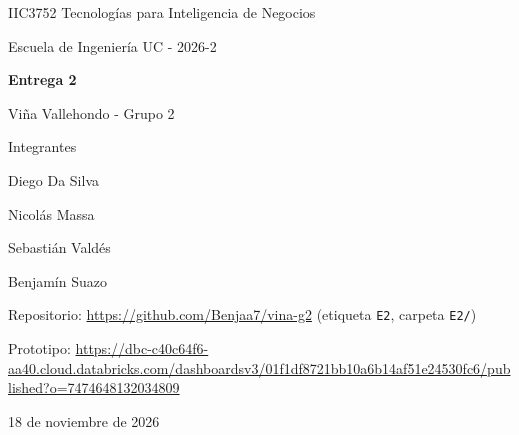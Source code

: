\documentclass[11pt,a4paper]{article}
\begin{document}
\begin{titlepage}
  \centering
  {\large IIC3752 Tecnologías para Inteligencia de Negocios\par}
  {\large Escuela de Ingeniería UC - 2026-2\par}
  \vspace{4cm}
  {\LARGE\bfseries Entrega 2\par}
  \vspace{0.5cm}
  {\Large Viña Vallehondo - Grupo 2\par}
  \vspace{3cm}
  {\large Integrantes\par}
  \vspace{0.3cm}
  Diego Da Silva\par
  Nicolás Massa\par
  Sebastián Valdés\par
  Benjamín Suazo\par
  \vfill
  Repositorio: \url{https://github.com/Benjaa7/vina-g2} (etiqueta \texttt{E2}, carpeta \texttt{E2/})\par
  \vspace{0.2cm}
  {\small Prototipo: \url{https://dbc-c40c64f6-aa40.cloud.databricks.com/dashboardsv3/01f1df8721bb10a6b14af51e24530fc6/published?o=7474648132034809}\par}
  \vspace{0.5cm}
  18 de noviembre de 2026
\end{titlepage}










\clearpage
\appendix

\clearpage

\clearpage

\clearpage

\clearpage

\clearpage

\clearpage

\end{document}
